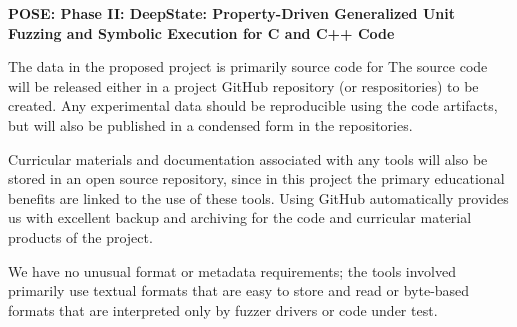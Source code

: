 \documentclass[12pt]{article}
\begin{document}

\begin{center}
  {\Large\sf\textbf{POSE: Phase II: DeepState: Property-Driven Generalized Unit Fuzzing and Symbolic Execution for C and C++ Code}}
\end{center}

The data in the proposed project is primarily source code for The
source code will be released either in a project GitHub repository (or
respositories) to be created. Any experimental data should be reproducible using the code artifacts, but will also be published in a condensed form in the repositories.

Curricular
materials and documentation associated with any tools will also be stored in
an open source repository, since in this project the primary
educational benefits are linked to the use of these tools.  Using GitHub automatically provides us with excellent backup
and archiving for the code and curricular material products of the
project.

We have no unusual format or metadata requirements; the
tools involved primarily use textual formats that are easy to store
and read or byte-based formats that are interpreted only by fuzzer
drivers or code under test.
\end{document}
